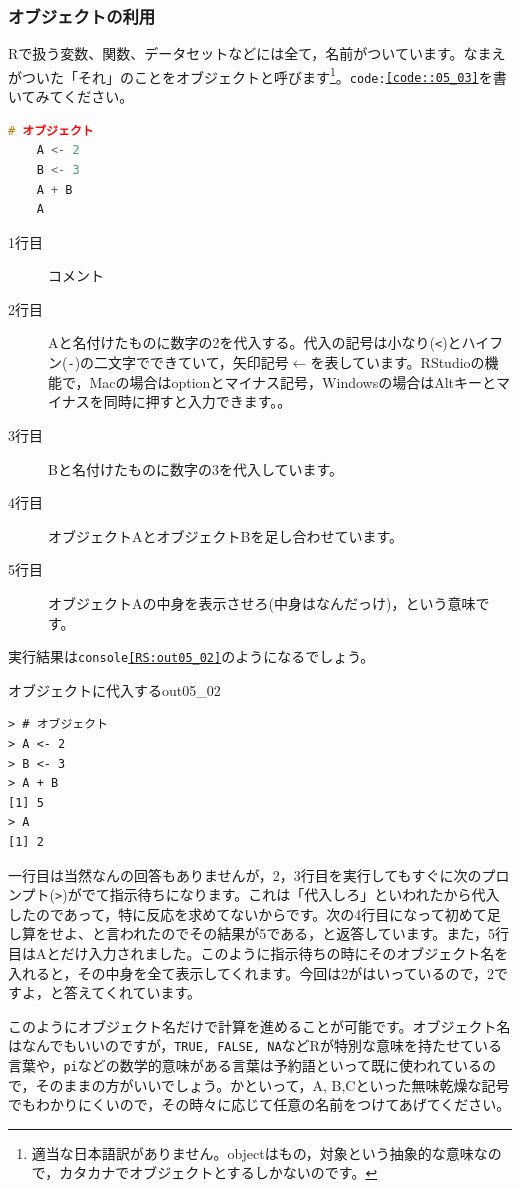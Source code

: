 \documentclass{ltjbook}
\begin{document}
\subsubsection{オブジェクトの利用}
Rで扱う変数、関数、データセットなどには全て，名前がついています。なまえがついた「それ」のことをオブジェクトと呼びます\footnote{適当な日本語訳がありません。objectはもの，対象という抽象的な意味なので，カタカナでオブジェクトとするしかないのです。}。\texttt{code:\ref{code::05_03}}を書いてみてください。
\begin{lstlisting}[language=c++,label={code::05_03},caption={オブジェクトに代入}]
	# オブジェクト
	A <- 2
	B <- 3
	A + B
	A
\end{lstlisting}
\begin{description}
    \item[1行目] コメント
	\item[2行目] Aと名付けたものに数字の2を代入する。代入の記号は小なり(\verb|<|)とハイフン(\verb|-|)の二文字でできていて，矢印記号$\leftarrow$を表しています。RStudioの機能で，Macの場合はoptionとマイナス記号，Windowsの場合はAltキーとマイナスを同時に押すと入力できます。。
    \item[3行目] Bと名付けたものに数字の3を代入しています。 
    \item[4行目] オブジェクトAとオブジェクトBを足し合わせています。 
	\item[5行目] オブジェクトAの中身を表示させろ(中身はなんだっけ)，という意味です。 
\end{description}

実行結果は\texttt{console\ref{RS:out05_02}}のようになるでしょう。
\begin{Rscreen}{オブジェクトに代入する}{out05_02}
	\begin{verbatim}
> # オブジェクト
> A <- 2
> B <- 3
> A + B
[1] 5
> A 
[1] 2
\end{verbatim}
\end{Rscreen}
一行目は当然なんの回答もありませんが，2，3行目を実行してもすぐに次のプロンプト(\verb|>|)がでて指示待ちになります。これは「代入しろ」といわれたから代入したのであって，特に反応を求めてないからです。次の4行目になって初めて足し算をせよ、と言われたのでその結果が5である，と返答しています。また，5行目はAとだけ入力されました。このように指示待ちの時にそのオブジェクト名を入れると，その中身を全て表示してくれます。今回は2がはいっているので，2ですよ，と答えてくれています。

このようにオブジェクト名だけで計算を進めることが可能です。オブジェクト名はなんでもいいのですが，\texttt{TRUE, FALSE, NA}などRが特別な意味を持たせている言葉や，\texttt{pi}などの数学的意味がある言葉は予約語といって既に使われているので，そのままの方がいいでしょう。かといって，A, B,Cといった無味乾燥な記号でもわかりにくいので，その時々に応じて任意の名前をつけてあげてください。
\end{document}
